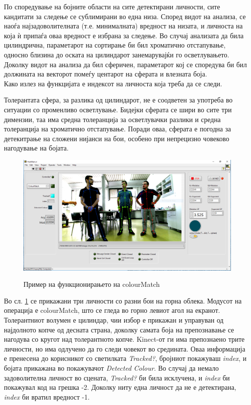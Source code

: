 \documentclass[11pt]{article}
\begin{document}
        По споредување на бојните области на сите детектирани личности, сите кандитати за следење се сублимирани во една низа. Според видот на анализа, се наоѓа најзадоволителната (т.е. минималната) вредност на низата, и личноста на која ѝ припаѓа оваа вредност е избрана за следење. Во случај анализата да била цилиндрична, параметарот на сортирање би бил хроматично отстапување, односно близина до оската на цилиндарот занемарувајќи го осветлувањето. Доколку видот на анализа да бил сферичен, параметарот кој се споредува би бил должината на векторот помеѓу центарот на сферата и влезната боја.
        \\
        Како излез на функцијата е индексот на личноста која треба да се следи.

        Толерантата сфера, за разлика од цилиндарот, не е соодветен за употреба во ситуации со променливо осветлување. Бидејки сферата се шири во сите три димензии, таа има средна толеранција за осветлувачки разлики и средна толеранција на хроматично отстапување. Поради оваа, сферата е погодна за детекитрање на сложени нијанси на бои, особено при непрецизно човеково нагодување на бојата.

      \begin{figure}[h]
        \centering
        \caption{Пример на функционирањето на colourMatch}
        \includegraphics[width = 0.85\linewidth]{./images/colourMatchGroupExample.png}
        \label{fig:exampleColourMatch}
      \end{figure}

      Во сл. \ref{fig:exampleColourMatch} се прикажани три личности со разни бои на горна облека. Модусот на операција е colourMatch, што се гледа во горно левиот агол на екранот. Толерантниот волумен е цилиндар, чии избор е прикажан и управуван од најдолното копче од десната страна, доколку самата боја на препознавање се нагодува со кругот над толерантното копче. Kinect-от ги има препознаено трите личности, но има одлучено да го следи човекот во средината. Оваа информација е пренесена до корисникот со светилката \textit{Tracked?}, бројниот покажуваш \textit{index}, и бојата прикажана во покажувачот \textit{Detected Colour}. Во случај да немало задоволителна личност во сцената, \textit{Tracked?} би била исклучена, и \textit{index} би покажувал код на грешка -2. Доколку ниту една личност да не е детектирана, \textit{index} би вратил вредност -1.
\end{document}
